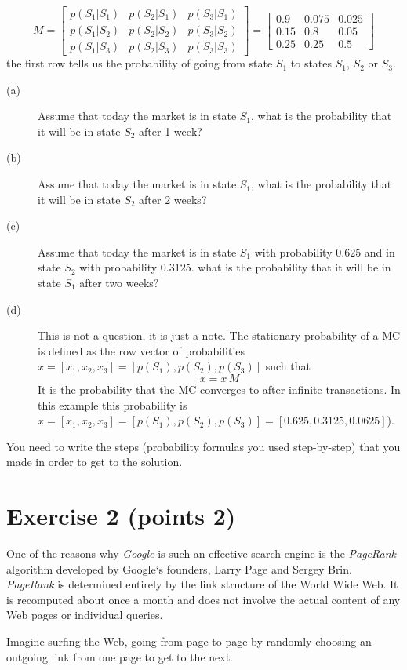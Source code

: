 \documentclass[a4paper,10pt]{article}
\begin{document}
$$
M=\begin{bmatrix}
p(S_1|S_1) &p(S_2|S_1)&p(S_3|S_1)\\
p(S_1|S_2) &p(S_2|S_2)&p(S_3|S_2)\\
p(S_1|S_3) &p(S_2|S_3)&p(S_3|S_3)   
  \end{bmatrix}=\begin{bmatrix}
0.9&0.075&0.025\\
0.15&0.8&0.05\\
0.25&0.25&0.5
     \end{bmatrix}
$$
the first row tells us the probability of going from state $S_1$ to states
$S_1$, $S_2$ or $S_3$.
\begin{description}
 \item[(a)] Assume that today the market is in state $S_1$,
 what is the probability that it will be in state $S_2$ after 1 week?
  \item[(b)] Assume that today the market is in state $S_1$,
 what is the probability that it will be in state $S_2$ after 2 weeks?
  \item[(c)] Assume that today the market is in state $S_1$ with probability
  $0.625$ and in state $S_2$ with probability $0.3125$.
 what is the probability that it will be in state $S_1$ after two weeks?
 \item[(d)] This is not a question, it is just a note. The stationary probability of a MC is defined as the row
 vector of probabilities $x=[x_1,x_2,x_3]=[p(S_1),p(S_2),p(S_3)]$ such that
 $$
 x=x\,M
 $$
 It is the probability that the MC converges to after infinite transactions.
In this example this probability is $x=[x_1,x_2,x_3]=[p(S_1),p(S_2),p(S_3)]=[0.625, 0.3125, 0.0625 ]$).
\end{description}
You need to write the steps (probability formulas you used step-by-step) that you made in order to get to the solution.

\section*{Exercise 2 (points 2)}
One of the reasons why \textit{Google} is such an effective search engine is the
\textit{PageRank} algorithm developed by Google‘s founders, Larry Page and Sergey
Brin.
\textit{PageRank} is determined entirely by the link structure of the World Wide Web.
It is recomputed about once a month and does not involve the actual content of
any Web pages or individual queries.

Imagine surfing the Web, going from page to page by randomly choosing an
outgoing link from one page to get to the next.
\end{document}
